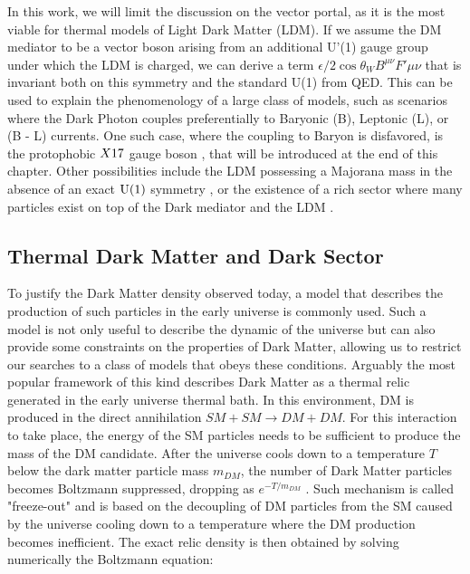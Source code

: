 In this work, we will limit the discussion on the vector portal, as it is the most viable for thermal models of Light Dark Matter (LDM). If we assume the DM mediator to be a vector boson arising from an additional U'(1) gauge group under which the LDM is charged, we can derive a term $\epsilon / 2 \cos{\theta_W} B^{\mu \nu} F'{\mu \nu}$ that is invariant both on this symmetry and the standard U(1) from QED. This can be used to explain the phenomenology of a large class of models, such as scenarios where the Dark Photon couples preferentially to Baryonic (B), Leptonic (L), or (B - L) currents. One such case, where the coupling to Baryon is disfavored, is the protophobic $X17$ gauge boson \cite{PhysRevD.95.035017}, that will be introduced at the end of this chapter. Other possibilities include the LDM possessing a Majorana mass in the absence of an exact $\rm{U(1)}$ symmetry \cite{PhysRevD.93.063523}, or the existence of a rich sector where many particles exist on top of the Dark mediator and the LDM \cite{Morrissey_2014}.

\subsection{Thermal Dark Matter and Dark Sector}
\label{ch1:sec:thermal-dm}

To justify the Dark Matter density observed today, a model that describes the production of such particles in the early universe is commonly used. Such a model is not only useful to describe the dynamic of the universe but can also provide some constraints on the properties of Dark Matter, allowing us to restrict our searches to a class of models that obeys these conditions. Arguably the most popular framework of this kind describes Dark Matter as a thermal relic generated in the early universe thermal bath. In this environment, DM is produced in the direct annihilation $SM+SM \to DM+DM$. For this interaction to take place, the energy of the SM particles needs to be sufficient to produce the mass of the DM candidate. After the universe cools down to a temperature $T$ below the dark matter particle mass $m_{DM}$, the number of Dark Matter particles becomes Boltzmann suppressed, dropping as $e^{- T / m_{DM}}$ \cite{Feng:2010gw}. Such mechanism is called "freeze-out" and is based on the decoupling of DM particles from the SM caused by the universe cooling down to a temperature where the DM production becomes inefficient. The exact relic density is then obtained by solving numerically the Boltzmann equation:

